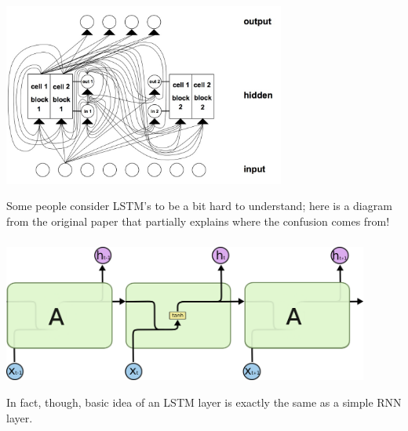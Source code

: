 \documentclass[xetex,mathserif,serif,aspectratio=169]{beamer}
\begin{document}
\begin{frame}[fragile] \frametitle{} \oldB \small

\begin{center}
\includegraphics[height=6cm]{img/lstmPaperImg.jpg}
\end{center}

Some people consider LSTM's to be a bit hard to understand;
here is a diagram from the original paper that partially
explains where the confusion comes from!

\end{frame}

\begin{frame}[fragile] \frametitle{} \oldB \small

\begin{center}
\includegraphics[height=4.5cm]{img/cloah05.png}
\end{center}

In fact, though, basic idea of an LSTM layer is exactly
the same as a simple RNN layer.

\end{frame}
\end{document}

